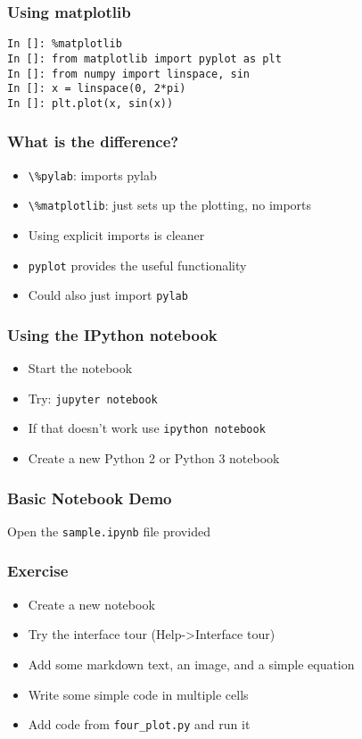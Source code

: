 \documentclass[14pt,compress]{beamer}
\newcommand{\typ}[1]{\lstinline{#1}}
\begin{document}
\begin{frame}[fragile]
  \frametitle{Using matplotlib}
  \begin{lstlisting}
In []: %matplotlib
In []: from matplotlib import pyplot as plt
In []: from numpy import linspace, sin
In []: x = linspace(0, 2*pi)
In []: plt.plot(x, sin(x))
  \end{lstlisting}
\end{frame}

\begin{frame}[fragile]
  \frametitle{What is the difference?}
  \begin{itemize}
  \item \typ{\%pylab}: imports pylab
  \item \typ{\%matplotlib}: just sets up the plotting, no imports
  \item Using explicit imports is cleaner
  \item \typ{pyplot} provides the useful functionality
  \item Could also just import \typ{pylab}
  \end{itemize}
\end{frame}

\begin{frame}[fragile]
  \frametitle{Using the IPython notebook}

  \begin{itemize}
  \item Start the notebook
  \item Try:
    \typ{jupyter notebook}
  \item If that doesn't work use \typ{ipython notebook}
  \item Create a new Python 2 or Python 3 notebook
  \end{itemize}
\end{frame}

\begin{frame}
  \frametitle{Basic Notebook Demo}
  \begin{center}
    Open the \typ{sample.ipynb} file provided
  \end{center}
\end{frame}

\begin{frame}
  \frametitle{Exercise}
  \begin{itemize}
  \item Create a new notebook
  \item Try the interface tour (Help->Interface tour)
  \item Add some markdown text, an image, and a simple equation
  \item Write some simple code in multiple cells
  \item Add code from \typ{four_plot.py} and run it
  \end{itemize}
\end{frame}
\end{document}
